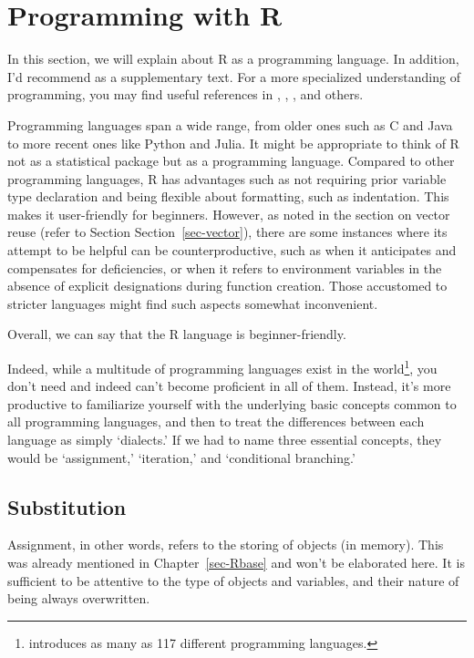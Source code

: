 \documentclass[
  a4paper,
]{book}
\begin{document}

\chapter{Programming with R}\label{programming-with-r}

In this section, we will explain about R as a programming language. In
addition, I'd recommend \textcite{kosugi2023} as a supplementary text.
For a more specialized understanding of programming, you may find useful
references in \textcite{Jared_P_Lander2018-12-28},
\textcite{Ren_Kun2017-11-23}, \textcite{Hadley_Wickham2016-02-10}, and
others.

Programming languages span a wide range, from older ones such as C and
Java to more recent ones like Python and Julia. It might be appropriate
to think of R not as a statistical package but as a programming
language. Compared to other programming languages, R has advantages such
as not requiring prior variable type declaration and being flexible
about formatting, such as indentation. This makes it user-friendly for
beginners. However, as noted in the section on vector reuse (refer to
Section Section~\ref{sec-vector}), there are some instances where its
attempt to be helpful can be counterproductive, such as when it
anticipates and compensates for deficiencies, or when it refers to
environment variables in the absence of explicit designations during
function creation. Those accustomed to stricter languages might find
such aspects somewhat inconvenient.

Overall, we can say that the R language is beginner-friendly.

Indeed, while a multitude of programming languages exist in the
world\footnote{\textcite{Language2016} introduces as many as 117
  different programming languages.}, you don't need and indeed can't
become proficient in all of them. Instead, it's more productive to
familiarize yourself with the underlying basic concepts common to all
programming languages, and then to treat the differences between each
language as simply `dialects.' If we had to name three essential
concepts, they would be `assignment,' `iteration,' and `conditional
branching.'

\section{Substitution}\label{substitution}

Assignment, in other words, refers to the storing of objects (in
memory). This was already mentioned in Chapter~\ref{sec-Rbase} and won't
be elaborated here. It is sufficient to be attentive to the type of
objects and variables, and their nature of being always overwritten.
\end{document}
